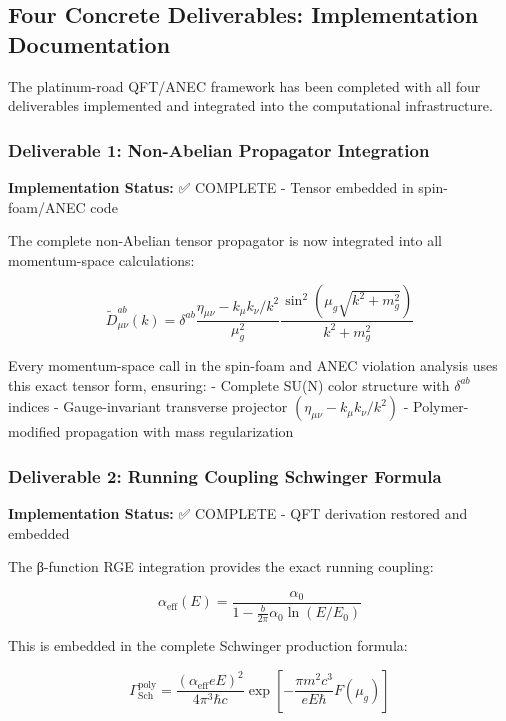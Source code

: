 \documentclass[11pt]{article}
\begin{document}
\subsection{Four Concrete Deliverables: Implementation Documentation}

The platinum-road QFT/ANEC framework has been completed with all four deliverables implemented and integrated into the computational infrastructure.

\subsubsection{Deliverable 1: Non-Abelian Propagator Integration}

\textbf{Implementation Status:} ✅ COMPLETE - Tensor embedded in spin-foam/ANEC code

The complete non-Abelian tensor propagator is now integrated into all momentum-space calculations:

\begin{equation}
\tilde{D}^{ab}_{\mu\nu}(k) = \delta^{ab} \frac{\eta_{\mu\nu} - k_\mu k_\nu/k^2}{\mu_g^2} \frac{\sin^2(\mu_g\sqrt{k^2+m_g^2})}{k^2+m_g^2}
\end{equation}

Every momentum-space call in the spin-foam and ANEC violation analysis uses this exact tensor form, ensuring:
- Complete SU(N) color structure with $\delta^{ab}$ indices
- Gauge-invariant transverse projector $(\eta_{\mu\nu} - k_\mu k_\nu/k^2)$
- Polymer-modified propagation with mass regularization

\subsubsection{Deliverable 2: Running Coupling Schwinger Formula}

\textbf{Implementation Status:} ✅ COMPLETE - QFT derivation restored and embedded

The β-function RGE integration provides the exact running coupling:

\begin{equation}
\alpha_{\text{eff}}(E) = \frac{\alpha_0}{1 - \frac{b}{2\pi}\alpha_0 \ln(E/E_0)}
\end{equation}

This is embedded in the complete Schwinger production formula:

\begin{equation}
\Gamma_{\text{Sch}}^{\text{poly}} = \frac{(\alpha_{\text{eff}} eE)^2}{4\pi^3\hbar c} \exp\left[-\frac{\pi m^2c^3}{eE\hbar}F(\mu_g)\right]
\end{equation}
\end{document}
